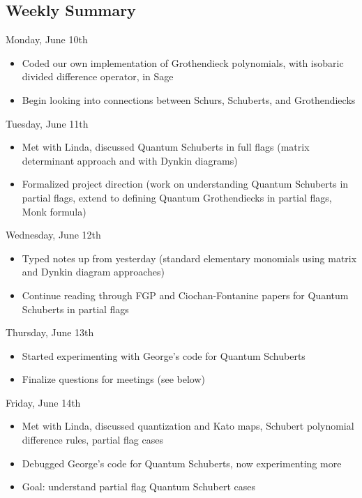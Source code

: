 \subsection{Weekly Summary}

Monday, June 10th
\begin{itemize}
    \item Coded our own implementation of Grothendieck polynomials, with isobaric divided difference operator, in Sage
    \item Begin looking into connections between Schurs, Schuberts, and Grothendiecks
\end{itemize}

Tuesday, June 11th
\begin{itemize}
    \item Met with Linda, discussed Quantum Schuberts in full flags (matrix determinant approach and with Dynkin diagrams)
    \item Formalized project direction (work on understanding Quantum Schuberts in partial flags, extend to defining Quantum Grothendiecks in partial flags, Monk formula)
\end{itemize}

Wednesday, June 12th
\begin{itemize}
    \item Typed notes up from yesterday (standard elementary monomials using matrix and Dynkin diagram approaches)
    \item Continue reading through FGP and Ciochan-Fontanine papers for Quantum Schuberts in partial flags
\end{itemize}

Thursday, June 13th
\begin{itemize}
    \item Started experimenting with George's code for Quantum Schuberts
    \item Finalize questions for meetings (see below)
\end{itemize}

Friday, June 14th
\begin{itemize}
    \item Met with Linda, discussed quantization and Kato maps, Schubert polynomial difference rules, partial flag cases
    \item Debugged George's code for Quantum Schuberts, now experimenting more
    \item Goal: understand partial flag Quantum Schubert cases
\end{itemize}


